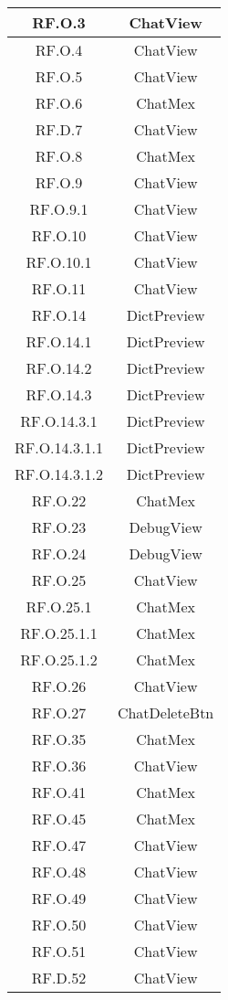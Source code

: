 \begin{adjustwidth}{-0.5cm}{-0.5cm}
\begin{longtable}{|c|c|}
    RF.O.3 & ChatView \\
		\hline RF.O.4 & ChatView \\
    \hline RF.O.5 & ChatView \\
    \hline RF.O.6 & ChatMex \\
    \hline RF.D.7 & ChatView \\
    \hline RF.O.8 & ChatMex \\
    \hline RF.O.9 & ChatView \\
    \hline RF.O.9.1 & ChatView \\
    \hline RF.O.10 & ChatView \\
    \hline RF.O.10.1 & ChatView \\
    \hline RF.O.11 & ChatView \\
    \hline RF.O.14 & DictPreview \\
    \hline RF.O.14.1 & DictPreview \\
    \hline RF.O.14.2 & DictPreview \\
    \hline RF.O.14.3 & DictPreview \\
    \hline RF.O.14.3.1 & DictPreview \\
    \hline RF.O.14.3.1.1 & DictPreview \\
    \hline RF.O.14.3.1.2 & DictPreview \\
    \hline RF.O.22 & ChatMex \\
    \hline RF.O.23 & DebugView \\
    \hline RF.O.24 & DebugView \\
    \hline RF.O.25 & ChatView \\
    \hline RF.O.25.1 & ChatMex \\
    \hline RF.O.25.1.1 & ChatMex \\
    \hline RF.O.25.1.2 & ChatMex \\
    \hline RF.O.26 & ChatView \\
    \hline RF.O.27 & ChatDeleteBtn \\
    \hline RF.O.35 & ChatMex \\
    \hline RF.O.36 & ChatView \\
    \hline RF.O.41 & ChatMex \\
    \hline RF.O.45 & ChatMex \\
    \hline RF.O.47 & ChatView \\
    \hline RF.O.48 & ChatView \\
    \hline RF.O.49 & ChatView \\
    \hline RF.O.50 & ChatView \\
    \hline RF.O.51 & ChatView \\
    \hline RF.D.52 & ChatView \\
  \end{longtable}
\end{adjustwidth}
\egroup

